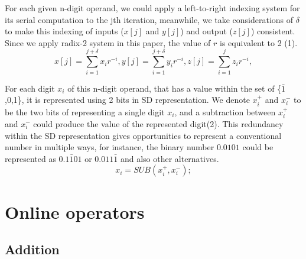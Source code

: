 \documentclass{sig-alternate}
\begin{document}
	For each given n-digit operand, we could apply a left-to-right indexing system for its serial computation to the jth iteration, meanwhile, we take considerations of $\delta$ to make this indexing of inputs ($x[j]$ and $y[j]$) and output ($z[j]$) consistent. Since we apply radix-2 system in this paper,  the value of $r$ is equivalent to 2 (1)\cite{digital_arithmetic_book}.
	\begin{equation}
	 x[j]=\sum_{i=1}^{j+\delta}x_{i}r^{-i},y[j]=\sum_{i=1}^{j+\delta}y_{i}r^{-i},z[j]=\sum_{i=1}^{j}z_{i}r^{-i},
	\end{equation}
	
	For each digit $x_{i}$ of this n-digit operand, that has a value within the set of  \{$\bar{1}$,0,1\},  it is represented using 2  bits in SD representation. We denote $x_i^+$ and $x_i^-$ to be the two bits of representing a single digit $x_{i}$, and a subtraction between $x_i^+$ and $x_i^-$ could produce the value of the represented digit(2). This redundancy within the SD representation gives opportunities to represent a conventional number in multiple ways, for instance, the binary number $0.0101$ could be represented as $0.1\bar{1}01$ or $0.011\bar{1}$ and also other alternatives. 
	\begin{equation}
		x_{i}= SUB (x_i^+,x_i^-);
	\end{equation}
	
	\section{Online operators}
	
	\subsection{Addition}
	
\end{document}
